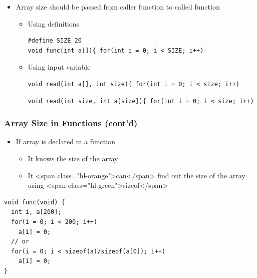 \documentclass{../c-lecture}
\begin{document}
\begin{frame}[fragile]
  \begin{itemize}
    \item
      Array size should be passed from caller function to called function

    \begin{itemize}
      \item Using definitions
      \begin{verbatim}
#define SIZE 20
void func(int a[]){ for(int i = 0; i < SIZE; i++)
      \end{verbatim}
      \item Using input variable
      \begin{verbatim}
void read(int a[], int size){ for(int i = 0; i < size; i++)
      \end{verbatim}
      \begin{verbatim}
void read(int size, int a[size]){ for(int i = 0; i < size; i++)
      \end{verbatim}
    \end{itemize}
  \end{itemize}
\end{frame}

\begin{frame}[fragile]
  \frametitle{Array Size in Functions (cont’d)}
  \begin{itemize}
    \item If array is declared in a function
    \begin{itemize}
      \item It knows the size of the array
      \item
        It <span class="hl-orange">can</span> find out the size of the array
        using <span class="hl-green">sizeof</span>

    \end{itemize}
  \end{itemize}
  \begin{verbatim}
void func(void) {
  int i, a[200];
  for(i = 0; i < 200; i++)
    a[i] = 0;
  // or
  for(i = 0; i < sizeof(a)/sizeof(a[0]); i++)
    a[i] = 0;
}
  \end{verbatim}
\end{frame}
\end{document}
